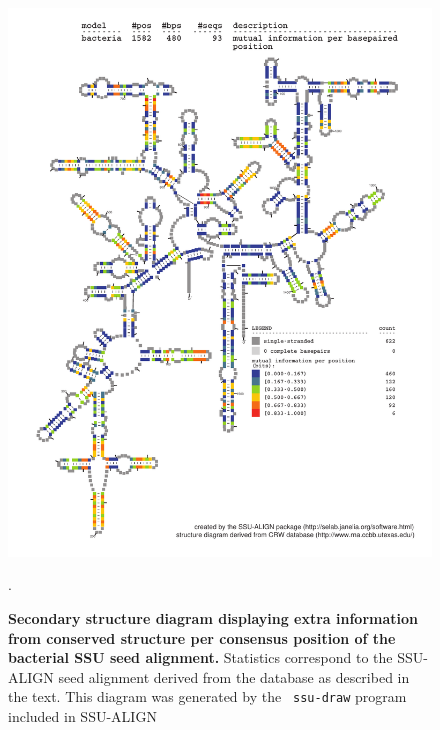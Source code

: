 \begin{figure}
\begin{center}
\includegraphics[width=5.64in]{Figures/bacteria-0p1-mutinfo}
\end{center}
\caption[Secondary structure diagram displaying extra information 
  from conserved structure per consensus position of the bacterial SSU seed
  alignment]{\textbf{Secondary structure diagram displaying extra
  information from conserved structure per consensus position of the bacterial SSU seed
  alignment.} Statistics correspond to the SSU-ALIGN seed
  alignment derived from the  database \cite{CannoneGutell02}
  as described in the text. This diagram was generated by the {\tt
  ssu-draw} program included in SSU-ALIGN}.
\label{fig:bacsinfo}
\end{figure}

\newpage 

